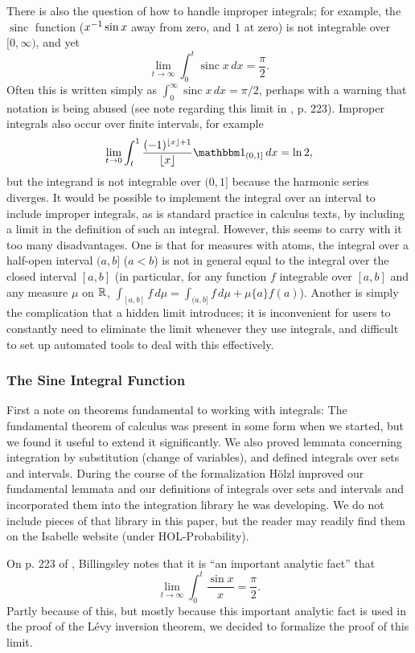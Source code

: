 \documentclass[leqno]{article}
\theoremstyle{definition}
\newcommand\sinc{\mathop{\text{sinc}}\nolimits}
\newcommand\floor[1]{\lfloor {#1} \rfloor}
\begin{document}
There is also the question of how to handle improper integrals; for example, the $\sinc$ function ($x^{-1} \sin x$ away from zero, and $1$ at zero) is not integrable over $[0,\infty)$, and yet 
\[ \lim_{t \rightarrow \infty} \int_0^t \sinc x \, dx = \frac{\pi}{2}. \]
Often this is written simply as $\int_0^\infty \sinc x \, dx = \pi/2$, perhaps with a warning that notation is being abused (see note regarding this limit in \cite{billingsley}, p. 223). Improper integrals also occur over finite intervals, for example
\[ \lim_{t \rightarrow 0} \int_t^1 \frac{(-1)^{\floor x + 1}}{\floor x} \mathbbm 1_{(0,1]} \, dx = \ln 2, \]
but the integrand is not integrable over $(0,1]$ because the harmonic series diverges. It would be possible to implement the integral over an interval to include improper integrals, as is standard practice in calculus texts, by including a limit in the definition of such an integral. However, this seems to carry with it too many disadvantages. One is that for measures with atoms, the integral over a half-open interval $(a,b]$ ($a < b$) is not in general equal to the integral over the closed interval $[a,b]$ (in particular, for any function $f$ integrable over $[a,b]$ and any measure $\mu$ on $\mathbb{R}$, $\int_{[a,b]} f \, d\mu = \int_{(a,b]} f \, d\mu + \mu \{a\} f(a)$). Another is simply the complication that a hidden limit introduces; it is inconvenient for users to constantly need to eliminate the limit whenever they use integrals, and difficult to set up automated tools to deal with this effectively.

\subsubsection{The Sine Integral Function} \label{sec:Si}

First a note on theorems fundamental to working with integrals: The fundamental theorem of calculus was present in some form when we started, but we found it useful to extend it significantly. We also proved lemmata concerning integration by substitution (change of variables), and defined integrals over sets and intervals. During the course of the formalization H\"olzl improved our fundamental lemmata and our definitions of integrals over sets and intervals and incorporated them into the integration library he was developing. We do not include pieces of that library in this paper, but the reader may readily find them on the Isabelle website (under HOL-Probability).

On p. 223 of \cite{billingsley}, Billingsley notes that it is ``an important analytic fact'' that
\[ \lim_{t \rightarrow \infty} \int_0^t \frac{\sin x}{x} = \frac{\pi}{2}. \]
Partly because of this, but mostly because this important analytic fact is used in the proof of the L\'evy inversion theorem, we decided to formalize the proof of this limit.
\end{document}
